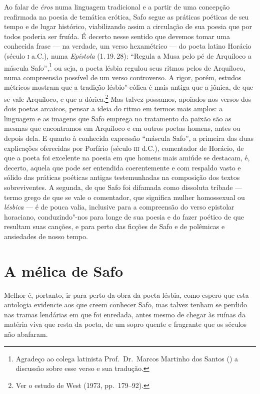 Ao falar de \textit{éros} numa linguagem tradicional e a partir de uma concepção
reafirmada na poesia de temática erótica, Safo segue as práticas poéticas de
seu tempo e de lugar histórico, viabilizando assim a circulação de sua poesia
que por todos poderia ser fruída. É decerto nesse sentido que
devemos tomar uma conhecida frase --- na verdade, um verso hexamétrico --- do poeta
latino Horácio (século \textsc{i} a.C.), numa \textit{Epístola} (1.\,19.\,28):
``Regula a Musa pelo pé de Arquíloco a máscula Safo”,\footnote{ Agradeço
ao colega latinista Prof.~Dr.~Marcos Martinho dos Santos () a discussão sobre esse verso e
sua tradução.} ou seja, a poeta lésbia regulou seus ritmos pelos de Arquíloco,
numa compreensão possível de um verso controverso. A rigor, porém,
estudos métricos mostram que a tradição lésbio"-eólica é mais antiga que a
jônica, de que se vale Arquíloco, e que a dórica.\footnote{ Ver o estudo de West
(1973, pp.~179--92).} Mas talvez possamos, apoiados nos versos dos dois poetas
arcaicos, pensar a ideia do ritmo em termos mais amplos: a linguagem e
as imagens que Safo emprega no tratamento da paixão são as mesmas que
encontramos em Arquíloco e em outros poetas homens, antes ou depois dela. E
quanto à conhecida expressão ``máscula Safo”, a primeira das duas
explicações oferecidas por Porfírio (século \textsc{iii} d.C.), comentador de Horácio,
de que a poeta foi excelente na poesia em que homens mais amiúde se
destacam, é, decerto, aquela que pode ser entendida coerentemente e com
respaldo vasto e sólido das práticas poéticas antigas testemunhadas na
composição dos textos sobreviventes. A segunda, de que Safo foi difamada como
dissoluta tríbade --- termo grego de que se vale o comentador, que significa
mulher homossexual ou \textit{lésbica} --- é de pouca valia, inclusive para a
compreensão do verso epistolar horaciano, conduzindo"-nos para longe de sua
poesia e do fazer poético de que resultam suas canções, e para perto das
ficções de Safo e de polêmicas e ansiedades de nosso tempo. 


\section*{A mélica de Safo}

Melhor é, portanto, ir para perto da obra da poeta lésbia, como espero que esta
antologia evidencie aos que creem conhecer Safo, mas talvez tenham se perdido
nas tramas lendárias em que foi enredada, antes mesmo de chegar às ruínas da
matéria viva que resta da poeta, de um sopro quente e fragrante que os séculos
não abafaram.

